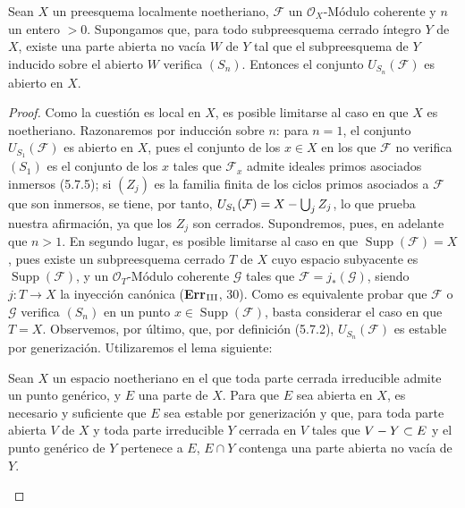 \begin{proposition}[6.11.6]
\label{IV.2.s6.11.6-fr}
Sean $X$ un preesquema localmente noetheriano, $\mathcal F$ un
$\mathcal O_X$-Módulo coherente y $n$ un entero $>0$. Supongamos que, para todo
subpreesquema cerrado íntegro $Y$ de $X$, existe una parte abierta no
vacía $W$ de $Y$ tal que el subpreesquema de $Y$ inducido sobre el abierto $W$
verifica $(S_n)$. Entonces el conjunto $U_{S_n}(\mathcal F)$ es abierto en
$X$.
\end{proposition}


\begin{proof}
Como la cuestión es local en $X$, es posible limitarse al caso en que $X$ es
noetheriano. Razonaremos por inducción sobre $n$: para $n=1$,
el conjunto $U_{S_1}(\mathcal F)$ es abierto en $X$, pues el conjunto de los
$x\in X$ en los que $\mathcal F$ no verifica $(S_1)$ es el conjunto de los $x$ tales
que $\mathcal F_x$ admite ideales primos asociados inmersos (5.7.5);
si $(Z_j)$ es la familia finita de los ciclos primos asociados a $\mathcal F$
que son inmersos, se tiene, por tanto,
$U_{S_1}(\mathcal F)=X-\bigcup_jZ_j$, lo que prueba nuestra afirmación, ya que los
$Z_j$ son cerrados. Supondremos, pues, en adelante que $n>1$. En segundo
lugar, es posible limitarse al caso en que
$\operatorname{Supp}(\mathcal F)=X$, pues existe un subpreesquema cerrado
$T$ de $X$ cuyo espacio subyacente es $\operatorname{Supp}(\mathcal F)$,
y un $\mathcal O_T$-Módulo coherente $\mathcal G$ tales que
$\mathcal F=j_*(\mathcal G)$, siendo $j:T\to X$ la inyección canónica
(\textbf{Err}$_{\rm III}$, 30). Como es equivalente probar que $\mathcal F$
o $\mathcal G$ verifica $(S_n)$ en un punto
$x\in\operatorname{Supp}(\mathcal F)$, basta considerar el
caso en que $T=X$. Observemos, por último, que, por definición (5.7.2),
$U_{S_n}(\mathcal F)$ es estable por generización. Utilizaremos el
lema siguiente:

\begin{lemma}[6.11.6.1]
\label{IV.2.s6.11.6.1-fr}
Sean $X$ un espacio noetheriano en el que toda parte cerrada irreducible
admite un punto genérico, y $E$ una parte de $X$. Para que $E$ sea abierta
en $X$, es necesario y suficiente que $E$ sea estable por generización y que,
para toda parte abierta $V$ de $X$ y toda parte irreducible $Y$ cerrada
en $V$ tales que $V- Y\subset E$ y el punto genérico de $Y$
pertenece a $E$, $E\cap Y$ contenga una parte abierta no vacía de $Y$.
\end{lemma}


\end{proof}
